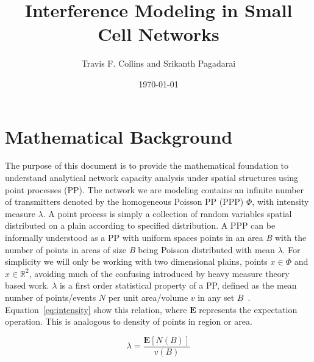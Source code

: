 \documentclass[a4paper]{article}
\title{Interference Modeling in Small Cell Networks}
\author{Travis F. Collins and Srikanth Pagadarai}
\date{\today}
\begin{document}
\maketitle

\section{Mathematical Background}
The purpose of this document is to provide the mathematical foundation to understand analytical network capacity analysis under spatial structures using point processes (PP).
The network we are modeling contains an infinite number of transmitters denoted by the homogeneous Poisson PP (PPP) $\Phi$, with intensity measure $\lambda$.  A point process is simply a collection of random variables spatial distributed on a plain according to specified distribution.  A PPP can be informally understood as a PP with uniform spaces points in an area \textit{B} with the number of points in areas of size \textit{B} being Poisson distributed with mean $\lambda$. For simplicity we will only be working with two dimensional plains, points $x\in\Phi$ and $x\in\mathbb{R}^2$, avoiding much of the confusing introduced by heavy measure theory based work.  $\lambda$ is a first order statistical property of a PP, defined as the mean number of points/events  $\textit{N}$ per unit area/volume $\textit{v}$ in any set $\textit{B}$~\cite{Illian2008}.  Equation~\eqref{eq:intensity} show this relation, where $\textbf{E}$ represents the expectation operation.  This is analogous to density of points in region or area.\par
%
\begin{equation}\label{eq:intensity}
\lambda = \frac{\textbf{E}[N(B)]}{v(B)}
\end{equation}
%
\end{document}

